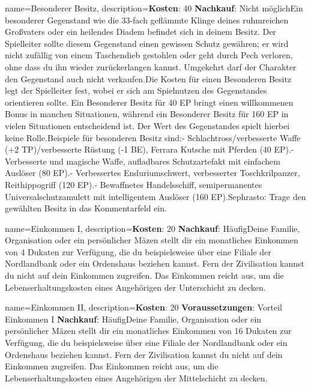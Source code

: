 {
    name={Besonderer Besitz},
    description={\textbf{Kosten}: 40 \textbf{Nachkauf}: Nicht möglich\newline Ein besonderer Gegenstand wie die 33-fach geflämmte Klinge deines ruhmreichen Großvaters oder ein heilendes Diadem befindet sich in deinem Besitz. Der Spielleiter sollte diesem Gegenstand einen gewissen Schutz gewähren; er wird nicht zufällig von einem Taschendieb gestohlen oder geht durch Pech verloren, ohne dass du ihn wieder zurückerlangen kannst. Umgekehrt darf der Charakter den Gegenstand auch nicht verkaufen.\newline Die Kosten für einen Besonderen Besitz legt der Spielleiter fest, wobei er sich am Spielnutzen des Gegenstandes orientieren sollte. Ein Besonderer Besitz für 40 EP bringt einen willkommenen Bonus in manchen Situationen, während ein Besonderer Besitz für 160 EP in vielen Situationen entscheidend ist. Der Wert des Gegenstandes spielt hierbei keine Rolle.\newline Beispiele für besonderen Besitz sind:\newline - Schlachtross/verbesserte Waffe (+2 TP)/verbesserte Rüstung (-1 BE), Ferrara Kutsche mit Pferden (40 EP).\newline - Verbesserte und magische Waffe, aufladbares Schutzartefakt mit einfachem Auslöser (80 EP).\newline - Verbessertes Enduriumschwert, verbesserter Toschkrilpanzer, Reithippogriff (120 EP).\newline - Bewaffnetes Handelsschiff, semipermanentes Universalschutzamulett mit intelligentem Auslöser (160 EP).\newline Sephrasto: Trage den gewählten Besitz in das Kommentarfeld ein.}
}


{
    name={Einkommen I},
    description={\textbf{Kosten}: 20 \textbf{Nachkauf}: Häufig\newline Deine Familie, Organisation oder ein persönlicher Mäzen stellt dir ein monatliches Einkommen von 4 Dukaten zur Verfügung, die du beispielsweise über eine Filiale der Nordlandbank oder ein Ordenshaus beziehen kannst. Fern der Zivilisation kannst du nicht auf dein Einkommen zugreifen. Das Einkommen reicht aus, um die Lebenserhaltungskosten eines Angehörigen der Unterschicht zu decken.}
}


{
    name={Einkommen II},
    description={\textbf{Kosten}: 20 \textbf{Voraussetzungen}: Vorteil Einkommen I \textbf{Nachkauf}: Häufig\newline Deine Familie, Organisation oder ein persönlicher Mäzen stellt dir ein monatliches Einkommen von 16 Dukaten zur Verfügung, die du beispielsweise über eine Filiale der Nordlandbank oder ein Ordenshaus beziehen kannst. Fern der Zivilisation kannst du nicht auf dein Einkommen zugreifen. Das Einkommen reicht aus, um die Lebenserhaltungskosten eines Angehörigen der Mittelschicht zu decken.}
}


